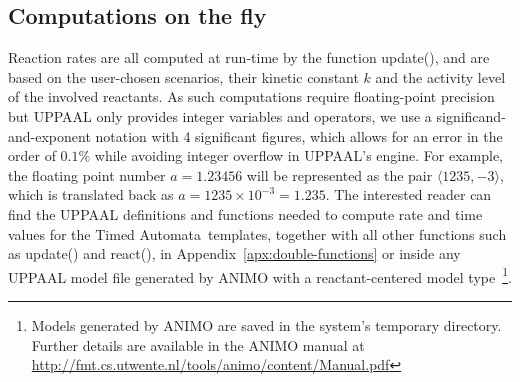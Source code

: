 \documentclass{llncs}
\newcommand{\tas}{Timed Automata}
\begin{document}
% 

\subsection{Computations on the fly}\label{sec:rates-ta-model}
Reaction rates are all computed at run-time by the function {\sf update()},
and are based on the user-chosen scenarios, their kinetic constant $k$ and the activity level of the involved reactants.
As such computations require floating-point precision but UPPAAL only provides integer
variables and operators, we use a significand-and-exponent notation with 4 significant figures, which allows for an error
in the order of $0.1 \%$ while 
avoiding integer overflow in UPPAAL's engine.
For example, the floating point number $a = 1.23456$ will be represented as the pair $\langle 1235, -3 \rangle$,
which is translated back as $a = 1235 \times 10^{-3} = 1.235$.
The interested reader can find the UPPAAL definitions and functions needed to compute rate and time values for the \tas\ templates,
together with all other functions such as {\sf update()} and {\sf react()},
in Appendix~\ref{apx:double-functions} or 
inside any UPPAAL model file generated by ANIMO with a reactant-centered model type~\footnote{Models generated
by ANIMO are saved in the system's temporary directory. Further details are available in
the ANIMO manual at \url{http://fmt.cs.utwente.nl/tools/animo/content/Manual.pdf}}.
\end{document}
